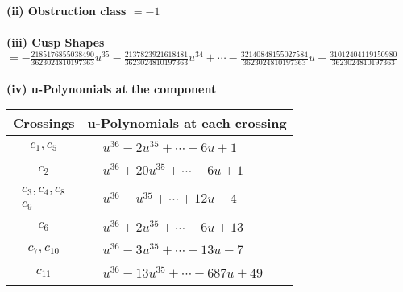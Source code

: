 \documentclass[1p]{elsarticle_modified}
\theoremstyle{definition}
\begin{document}
\flushleft \textbf{(ii) Obstruction class $= -1$}\\~\\
\flushleft \textbf{(iii) Cusp Shapes $= -\frac{2185176855038490}{3623024810197363} u^{35}-\frac{2137823921618481}{3623024810197363} u^{34}+\cdots-\frac{32140848155027584}{3623024810197363} u+\frac{31012404119150980}{3623024810197363}$}\\~\\
\newpage\renewcommand{\arraystretch}{1}
\flushleft \textbf{(iv) u-Polynomials at the component}\newline \\
\begin{tabular}{m{50pt}|m{274pt}}
Crossings & \hspace{64pt}u-Polynomials at each crossing \\
\hline $$\begin{aligned}c_{1},c_{5}\end{aligned}$$&$\begin{aligned}
&u^{36}-2 u^{35}+\cdots-6 u+1
\end{aligned}$\\
\hline $$\begin{aligned}c_{2}\end{aligned}$$&$\begin{aligned}
&u^{36}+20 u^{35}+\cdots-6 u+1
\end{aligned}$\\
\hline $$\begin{aligned}c_{3},c_{4},c_{8}\\c_{9}\end{aligned}$$&$\begin{aligned}
&u^{36}- u^{35}+\cdots+12 u-4
\end{aligned}$\\
\hline $$\begin{aligned}c_{6}\end{aligned}$$&$\begin{aligned}
&u^{36}+2 u^{35}+\cdots+6 u+13
\end{aligned}$\\
\hline $$\begin{aligned}c_{7},c_{10}\end{aligned}$$&$\begin{aligned}
&u^{36}-3 u^{35}+\cdots+13 u-7
\end{aligned}$\\
\hline $$\begin{aligned}c_{11}\end{aligned}$$&$\begin{aligned}
&u^{36}-13 u^{35}+\cdots-687 u+49
\end{aligned}$\\
\hline
\end{tabular}\\~\\
\end{document}
